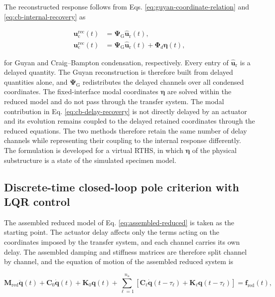 \documentclass[a4paper,fleqn,review,12pt]{cas-sc}
\begin{document}
The reconstructed response follows from Eqs. \eqref{eq:guyan-coordinate-relation} and \eqref{eq:cb-internal-recovery} as

\vspace{-3.5em}
\begin{subequations}
	\label{eq:delay-recovery}
	\begin{align}
		\bm{u}_{\mathrm{c}}^{\mathrm{rec}}(t)&=\bm{\Psi}_{\mathrm{G}}\hat{\bm{u}}_{\mathrm{r}}(t),
		\label{eq:guyan-delay-recovery}\\
		\bm{u}_{\mathrm{c}}^{\mathrm{rec}}(t)&=\bm{\Psi}_{\mathrm{G}}\hat{\bm{u}}_{\mathrm{r}}(t)
		+\bm{\Phi}_{d}\bm{\eta}(t),
		\label{eq:cb-delay-recovery}
	\end{align}
\end{subequations}
\vspace{-3.5em}

\noindent for Guyan and Craig--Bampton condensation, respectively. Every entry of \(\hat{\bm{u}}_{\mathrm{r}}\) is a delayed quantity. The Guyan reconstruction is therefore built from delayed quantities alone, and \(\bm{\Psi}_{\mathrm{G}}\) redistributes the delayed channels over all condensed coordinates. The fixed-interface modal coordinates \(\bm{\eta}\) are solved within the reduced model and do not pass through the transfer system. The modal contribution in Eq. \eqref{eq:cb-delay-recovery} is not directly delayed by an actuator and its evolution remains coupled to the delayed retained coordinates through the reduced equations. The two methods therefore retain the same number of delay channels while representing their coupling to the internal response differently.
The formulation is developed for a virtual RTHS, in which \(\bm{\eta}\) of the physical substructure is a state of the simulated specimen model.

\subsection{Discrete-time closed-loop pole criterion with LQR control}
\label{sec:pole-criterion}

The assembled reduced model of Eq. \eqref{eq:assembled-reduced} is taken as the starting point. The actuator delay affects only the terms acting on the coordinates imposed by the transfer system, and each channel carries its own delay. The assembled damping and stiffness matrices are therefore split channel by channel, and the equation of motion of the assembled reduced system is

\vspace{-3.5em}
\begin{equation}
	\mathbf{M}_{\mathrm{red}}\ddot{\bm{q}}(t)+\mathbf{C}_{0}\dot{\bm{q}}(t)+\mathbf{K}_{0}\bm{q}(t)
	+\sum_{\ell=1}^{n_{\mathrm{a}}}
	\left[
	\mathbf{C}_{\ell}\dot{\bm{q}}(t-\tau_{\ell})
	+\mathbf{K}_{\ell}\bm{q}(t-\tau_{\ell})
	\right]
	=\bm{f}_{\mathrm{red}}(t),
	\label{eq:delayed-eom}
\end{equation}
\vspace{-3.5em}
\end{document}

